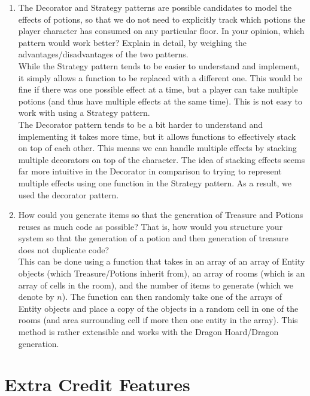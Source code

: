 \documentclass[12pt]{article}
\begin{document}
\begin{enumerate}
\item The Decorator and Strategy patterns are possible candidates to model the effects of potions, so that we do not need to explicitly track which potions the player character has consumed on any particular floor. In your opinion, which pattern would work better? Explain in detail, by weighing the advantages/disadvantages of the two patterns.\\


While the Strategy pattern tends to be easier to understand and implement, it simply allows a function to be replaced with a different one. This would be fine if there was one possible effect at a time, but a player can take multiple potions (and thus have multiple effects at the same time). This is not easy to work with using a Strategy pattern.\\

The Decorator pattern tends to be a bit harder to understand and implementing it takes more time, but it allows functions to effectively stack on top of each other. This means we can handle multiple effects by stacking multiple decorators on top of the character. The idea of stacking effects seems far more intuitive in the Decorator in comparison to trying to represent multiple effects using one function in the Strategy pattern. As a result, we used the decorator pattern.

\item How could you generate items so that the generation of Treasure and Potions reuses as much code as possible? That is, how would you structure your system so that the generation of a potion and then generation of treasure does not duplicate code?\\

This can be done using a function that takes in an array of an array of Entity objects (which Treasure/Potions inherit from), an array of rooms (which is an array of cells in the room), and the number of items to generate (which we denote by $n$). The function can then randomly take one of the arrays of Entity objects and place a copy of the objects in a random cell in one of the rooms (and area surrounding cell if more then one entity in the array). This method is rather extensible and works with the Dragon Hoard/Dragon generation. 
\end{enumerate}

\section*{Extra Credit Features}
\end{document}
